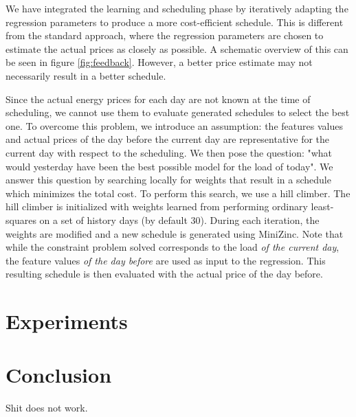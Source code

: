 \documentclass{article}
\begin{document}
We have integrated the learning and scheduling phase by iteratively adapting the regression parameters to produce a more cost-efficient schedule. This is different from the standard approach, where the regression parameters are chosen to estimate the actual prices as closely as possible. A schematic overview of this can be seen in figure \ref{fig:feedback}. However, a better price estimate may not necessarily result in a better schedule\cite{ifrim2012properties}.

Since the actual energy prices for each day are not known at the time of scheduling, we cannot use them to evaluate generated schedules to select the best one. To overcome this problem, we introduce an assumption: the features values and actual prices of the day before the current day are representative for the current day with respect to the scheduling. We then pose the question: "what would yesterday have been the best possible model for the load of today". We answer this question by searching locally for weights that result in a schedule which minimizes the total cost. To perform this search, we use a hill climber. The hill climber is initialized with weights learned from performing ordinary least-squares on a set of history days (by default 30). During each iteration, the weights are modified and a new schedule is generated using MiniZinc. Note that while the constraint problem solved corresponds to the load \emph{of the current day}, the feature values \emph{of the day before} are used as input to the regression. This resulting schedule is then evaluated with the actual price of the day before. 

\section{Experiments}
\section{Conclusion}

Shit does not work.



\end{document}
